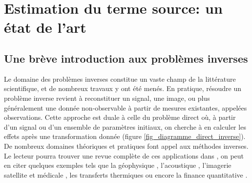 %
%	

%	
%	
%	

%	
%	
%		
	\section{Estimation du terme source: un état de l'art}
	\label{section_etat_art_STE}
	
	\subsection{Une brève introduction aux problèmes inverses}
	Le domaine des problèmes inverses constitue un vaste champ de la littérature scientifique, et de nombreux travaux y ont été menés. En pratique, résoudre un problème inverse revient à reconstituer un signal, une image, ou plus généralement une donnée non-observable à partir de mesures existantes, appelées observations.
	Cette approche est duale à celle du problème direct où, à partir d'un signal ou d'un ensemble de paramètres initiaux, on cherche à en calculer les effets après une transformation donnée (figure \ref{fig_diagramme_direct_inverse}).
	De nombreux domaines théoriques et pratiques font appel aux méthodes inverses. Le lecteur pourra trouver une revue complète de ces applications dans \cite{Tarantola2004}, on peut en citer quelques exemples tels que la géophysique \cite{Backus1967}, l'acoustique \cite{Kirsch1988}, l'imagerie satellite \cite{Park2003} et médicale \cite{Arridge1999}, les transferts thermiques \cite{McCormik1992} ou encore la finance quantitative \cite{Dembo1999}.\\
	
